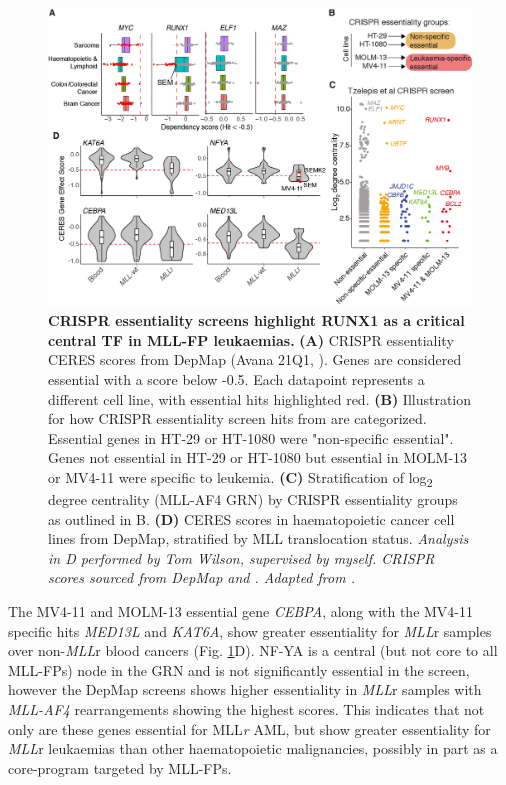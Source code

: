\begin{figure}[htbp]
    \centering
    \includegraphics[width=\textwidth,height=\textheight,keepaspectratio]{figures/chapter4/ch4_essentiality.png}
    \caption[{Essential genes.}]
    {\textbf{CRISPR essentiality screens highlight RUNX1 as a critical central TF in MLL-FP leukaemias.} 
    \textbf{(A)} CRISPR essentiality CERES scores from DepMap (Avana 21Q1, \cite{meyers_computational_2017, doench_optimized_2016}). Genes are considered essential with a score below -0.5. Each datapoint represents a different cell line, with essential hits highlighted red.
    \textbf{(B)} Illustration for how CRISPR essentiality screen hits from \cite{tzelepis_crispr_2016} are categorized. Essential genes in HT-29 or HT-1080 were "non-specific essential". Genes not essential in HT-29 or HT-1080 but essential in MOLM-13 or MV4-11 were specific to leukemia. 
    \textbf{(C)} Stratification of log\textsubscript{2} degree centrality (MLL-AF4 GRN) by CRISPR essentiality groups as outlined in B. 
    \textbf{(D)} CERES scores in haematopoietic cancer cell lines from DepMap, stratified by MLL translocation status. 
    \textit{Analysis in D performed by Tom Wilson, supervised by myself. CRISPR scores sourced from DepMap and \cite{tzelepis_crispr_2016}. Adapted from \cite{harman_kmt2a-aff1_2021}.} 
    }
    \label{fig:ch4_essentiality}
\end{figure}

The MV4-11 and MOLM-13 essential gene \textit{CEBPA}, along with the MV4-11 specific hits \textit{MED13L} and \textit{KAT6A}, show greater essentiality for \textit{MLL}r samples over non-\textit{MLL}r blood cancers (Fig. \ref{fig:ch4_essentiality}D). NF-YA is a central (but not core to all MLL-FPs) node in the GRN and is not significantly essential in the \cite{tzelepis_crispr_2016} screen, however the DepMap screens shows higher essentiality in \textit{MLL}r samples with \textit{MLL-AF4} rearrangements showing the highest scores. This indicates that not only are these genes essential for MLL\textit{r} AML, but show greater essentiality for \textit{MLL}r leukaemias than other haematopoietic malignancies, possibly in part as a core-program targeted by MLL-FPs. 